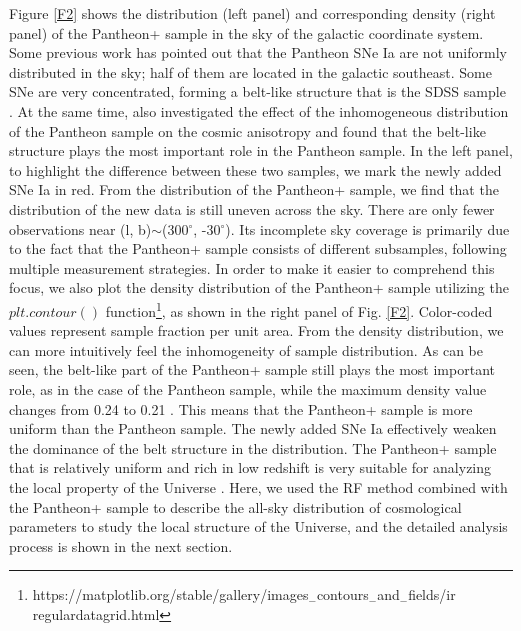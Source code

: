 \documentclass{aa}
\begin{document}
Figure \ref{F2} shows the distribution (left panel) and corresponding density (right panel) of the Pantheon+ sample in the sky of the galactic coordinate system. Some previous work has pointed out that the Pantheon SNe Ia are not uniformly distributed in the sky; half of them are located in the galactic southeast. Some SNe are very concentrated, forming a belt-like structure that is the SDSS sample \citep{2019MNRAS.486.5679Z}. At the same time, \citet{2019MNRAS.486.5679Z} also investigated the effect of the inhomogeneous distribution of the Pantheon sample on the cosmic anisotropy and found that the belt-like structure plays the most important role in the Pantheon sample. In the left panel, to highlight the difference between these two samples, we mark the newly added SNe Ia in red. From the distribution of the Pantheon+ sample, we find that the distribution of the new data is still uneven across the sky. There are only fewer observations near (l, b)$\sim$(300$^{\circ}$, -30$^{\circ}$). Its incomplete sky coverage is primarily due to the fact that the Pantheon+ sample consists of different subsamples, following multiple measurement strategies. In order to make it easier to comprehend this focus, we also plot the density distribution of the Pantheon+ sample utilizing the $plt.contour()$ function\footnote{https://matplotlib.org/stable/gallery/images$_{-}$contours$_{-}$and$_{-}$fields/ir regulardatagrid.html}, as shown in the right panel of Fig. \ref{F2}. Color-coded values represent sample fraction per unit area. From the density distribution, we can more intuitively feel the inhomogeneity of sample distribution. As can be seen, the belt-like part of the Pantheon+ sample still plays the most important role, as in the case of the Pantheon sample, while the maximum density value changes from 0.24 to 0.21 \citep{2020A&A...643A..93H}. This means that the Pantheon+ sample is more uniform than the Pantheon sample. The newly added SNe Ia effectively weaken the dominance of the belt structure in the distribution. The Pantheon+ sample that is relatively uniform and rich in low redshift is very suitable for analyzing the local property of the Universe \citep{2018ApJ...865..119A,2022PhRvD.105j3510L,2023PhRvD.107b3507K}. Here, we used the RF method combined with the Pantheon+ sample to describe the all-sky distribution of cosmological parameters to study the local structure of the Universe, and the detailed analysis process is shown in the next section. 
\end{document}
